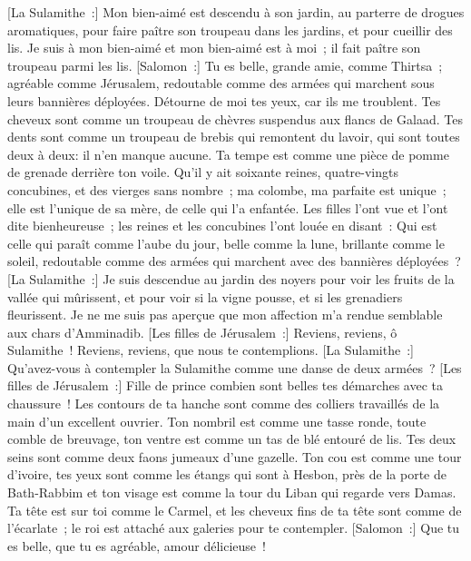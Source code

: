\begin{multicols}{2}
[La Sulamithe~:] Mon bien-aimé est descendu à son jardin, au parterre de drogues aromatiques, pour faire paître son troupeau dans les jardins, et pour cueillir des lis.
Je suis à mon bien-aimé et mon bien-aimé est à moi~; il fait paître son troupeau parmi les lis.
[Salomon~:] Tu es belle, grande amie, comme Thirtsa~; agréable comme Jérusalem, redoutable comme des armées qui marchent sous leurs bannières déployées. 
Détourne de moi tes yeux, car ils me troublent. Tes cheveux sont comme un troupeau de chèvres suspendus aux flancs de Galaad.
Tes dents sont comme un troupeau de brebis qui remontent du lavoir, qui sont toutes deux à deux: il n'en manque aucune.
Ta tempe est comme une pièce de pomme de grenade derrière ton voile.
Qu'il y ait soixante reines, quatre-vingts concubines, et des vierges sans nombre~;
ma colombe, ma parfaite est unique~; elle est l'unique de sa mère, de celle qui l'a enfantée. Les filles l'ont vue et l'ont dite bienheureuse~; les reines et les concubines l'ont louée en disant~:
Qui est celle qui paraît comme l'aube du jour, belle comme la lune, brillante comme le soleil, redoutable comme des armées qui marchent avec des bannières déployées~?
[La Sulamithe~:] Je suis descendue au jardin des noyers pour voir les fruits de la vallée qui mûrissent, et pour voir si la vigne pousse, et si les grenadiers fleurissent.
Je ne me suis pas aperçue que mon affection m'a rendue semblable aux chars d'Amminadib.
\VerseOne{}[Les filles de Jérusalem~:] Reviens, reviens, ô Sulamithe~! Reviens, reviens, que nous te contemplions. [La Sulamithe~:] Qu'avez-vous à contempler la Sulamithe comme une danse de deux armées~?
[Les filles de Jérusalem~:] Fille de prince combien sont belles tes démarches avec ta chaussure~! Les contours de ta hanche sont comme des colliers travaillés de la main d'un excellent ouvrier.
Ton nombril est comme une tasse ronde, toute comble de breuvage, ton ventre est comme un tas de blé entouré de lis.
Tes deux seins sont comme deux faons jumeaux d'une gazelle.
Ton cou est comme une tour d'ivoire, tes yeux sont comme les étangs qui sont à Hesbon, près de la porte de Bath-Rabbim et ton visage est comme la tour du Liban qui regarde vers Damas.
Ta tête est sur toi comme le Carmel, et les cheveux fins de ta tête sont comme de l'écarlate~; le roi est attaché aux galeries pour te contempler.
[Salomon~:] Que tu es belle, que tu es agréable, amour délicieuse~!

\end{multicols}
